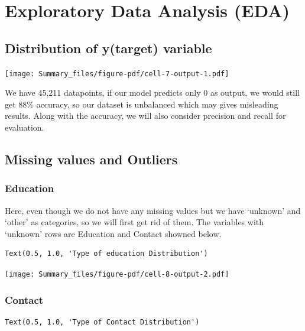 \documentclass[
  letterpaper,
  DIV=11,
  numbers=noendperiod]{scrartcl}
\begin{document}
\hypertarget{exploratory-data-analysis-eda}{%
\section{Exploratory Data Analysis
(EDA)}\label{exploratory-data-analysis-eda}}

\hypertarget{distribution-of-ytarget-variable}{%
\subsection{Distribution of y(target)
variable}\label{distribution-of-ytarget-variable}}

\texttt{[image: Summary\_files/figure-pdf/cell-7-output-1.pdf]}

We have 45,211 datapoints, if our model predicts only 0 as output, we
would still get 88\% accuracy, so our dataset is unbalanced which may
gives misleading results. Along with the accuracy, we will also consider
precision and recall for evaluation.

\hypertarget{missing-values-and-outliers}{%
\subsection{Missing values and
Outliers}\label{missing-values-and-outliers}}

\hypertarget{education}{%
\subsubsection{Education}\label{education}}

Here, even though we do not have any missing values but we have
`unknown' and `other' as categories, so we will first get rid of them.
The variables with `unknown' rows are Education and Contact showned
below.

\begin{verbatim}
Text(0.5, 1.0, 'Type of education Distribution')
\end{verbatim}

\texttt{[image: Summary\_files/figure-pdf/cell-8-output-2.pdf]}

\hypertarget{contact}{%
\subsubsection{Contact}\label{contact}}

\begin{verbatim}
Text(0.5, 1.0, 'Type of Contact Distribution')
\end{verbatim}
\end{document}
